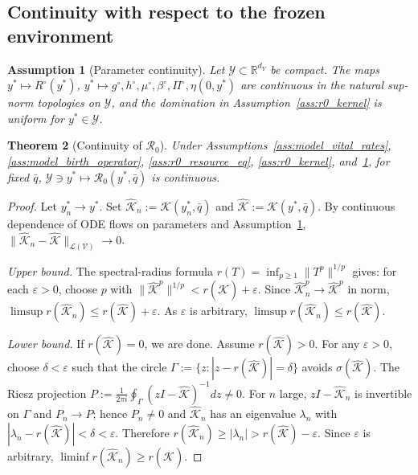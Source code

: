 \documentclass[pdflatex,sn-mathphys-num]{sn-jnl}%
\newtheorem{theorem}{Theorem}[section]
\newtheorem{assumption}[theorem]{Assumption}
\begin{document}
\subsection{Continuity with respect to the frozen environment}
\begin{assumption}[Parameter continuity]\label{ass:r0_param_cont}
Let \(\mathscr Y\subset\mathbb R^{d_Y}\) be compact. The maps
\(y^\ast\mapsto R^\circ(y^\ast)\),
\(y^\ast\mapsto g^\circ,h^\circ,\mu^\circ,\beta^\circ,\Pi^\circ,\eta(0,y^\ast)\)
are continuous in the natural sup-norm topologies on \(\mathscr Y\),
and the domination in Assumption~\ref{ass:r0_kernel} is uniform for
\(y^\ast\in\mathscr Y\).
\end{assumption}

\begin{theorem}[Continuity of \(\mathcal R_0\)]\label{thm:r0_cont}
Under Assumptions~\ref{ass:model_vital_rates}, \ref{ass:model_birth_operator}, \ref{ass:r0_resource_eq}, \ref{ass:r0_kernel}, and~\ref{ass:r0_param_cont}, for fixed \(\bar q\),
\(\mathscr Y\ni y^\ast\mapsto \mathcal R_0(y^\ast,\bar q)\)
is continuous.
\end{theorem}
\begin{proof}
Let \(y_n^\ast\to y^\ast\). Set
\(\hat{\mathcal K}_n:=\mathcal K(y_n^\ast,\bar q)\) and
\(\hat{\mathcal K}:=\mathcal K(y^\ast,\bar q)\).
By continuous dependence of ODE flows on parameters and Assumption~\ref{ass:r0_param_cont},
\(\|\hat{\mathcal K}_n-\hat{\mathcal K}\|_{\mathcal L(\mathcal V)}\to 0\).

\emph{Upper bound.} The spectral-radius formula
\(r(T)=\inf_{p\ge 1}\|T^p\|^{1/p}\)
gives: for each \(\varepsilon>0\), choose \(p\) with
\(\|\hat{\mathcal K}^p\|^{1/p}<r(\hat{\mathcal K})+\varepsilon\).
Since \(\hat{\mathcal K}_n^p\to\hat{\mathcal K}^p\) in norm,
\(\limsup r(\hat{\mathcal K}_n)\le r(\hat{\mathcal K})+\varepsilon\).
As \(\varepsilon\) is arbitrary, \(\limsup r(\hat{\mathcal K}_n)\le r(\hat{\mathcal K})\).

\emph{Lower bound.} If \(r(\hat{\mathcal K})=0\), we are done. Assume
\(r(\hat{\mathcal K})>0\). For any \(\varepsilon>0\), choose
\(\delta<\varepsilon\) such that the circle
\(\Gamma:=\{z:|z-r(\hat{\mathcal K})|=\delta\}\) avoids \(\sigma(\hat{\mathcal K})\).
The Riesz projection
\(P:=\frac{1}{2\pi i}\oint_\Gamma(zI-\hat{\mathcal K})^{-1}dz\neq 0\).
For \(n\) large, \(zI-\hat{\mathcal K}_n\) is invertible on \(\Gamma\) and
\(P_n\to P\); hence \(P_n\neq 0\) and \(\hat{\mathcal K}_n\) has an eigenvalue
\(\lambda_n\) with \(|\lambda_n-r(\hat{\mathcal K})|<\delta<\varepsilon\).
Therefore
\(r(\hat{\mathcal K}_n)\ge |\lambda_n|>r(\hat{\mathcal K})-\varepsilon\).
Since \(\varepsilon\) is arbitrary, \(\liminf r(\hat{\mathcal K}_n)\ge r(\hat{\mathcal K})\).
\end{proof}
\end{document}
